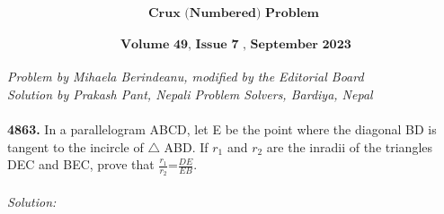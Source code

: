 \documentclass[12pt]{article}
\begin{document}
\[ \textbf{Crux (Numbered) Problem}\] \\
\[\textbf{ Volume 49, Issue 7 , September 2023} \] \\
\textit{Problem by Mihaela Berindeanu, modified by the Editorial Board} \\
\textit{Solution by Prakash Pant, Nepali Problem Solvers, Bardiya, Nepal} \\ \\
\textbf{4863.} In a parallelogram ABCD, let E be the point where the diagonal BD is tangent to the incircle of $\triangle$ ABD. If $r_1$ and $r_2$ are the inradii of the triangles DEC and BEC, prove that $\frac{r_1}{r_2}$=$\frac{DE}{EB}$. \\ \\
										\]
\textit{Solution:}
\end{document}
